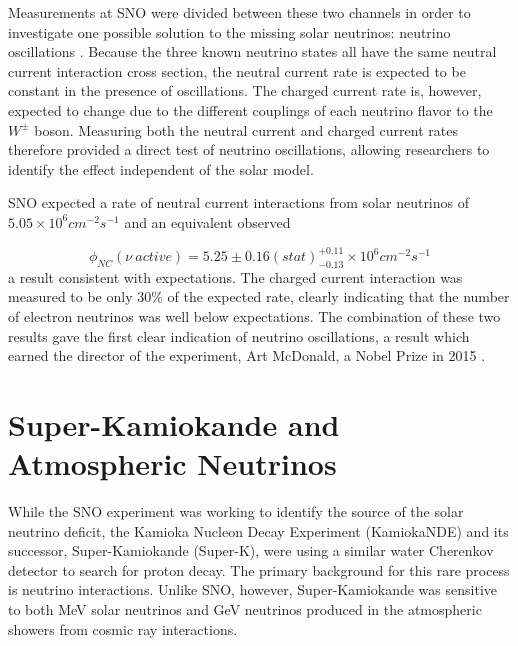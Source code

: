 Measurements at SNO were divided between these two channels in order to investigate one possible solution to the missing solar neutrinos: neutrino oscillations \cite{SNO-Proposal}.
Because the three known neutrino states all have the same neutral current interaction cross section, the neutral current rate is expected to be constant in the presence of oscillations.
The charged current rate is, however, expected to change due to the different couplings of each neutrino flavor to the $W^{\pm}$ boson.
Measuring both the neutral current and charged current rates therefore provided a direct test of neutrino oscillations, allowing researchers to identify the effect independent of the solar model.

SNO expected a rate of neutral current interactions from solar neutrinos of $5.05 \times 10^6 cm^{-2} s^{-1}$ and an equivalent observed 

\begin{equation}
\phi_{NC}\left(\nu \ active \right) = 5.25 \pm 0.16 (stat) ^{+0.11}_{-0.13} \times 10^6 cm^{-2} s^{-1}
\end{equation}
%
a result consistent with expectations.
The charged current interaction was measured to be only 30\% of the expected rate, clearly indicating that the number of electron neutrinos was well below expectations.
The combination of these two results gave the first clear indication of neutrino oscillations, a result which earned the director of the experiment, Art McDonald, a Nobel Prize in 2015 \cite{NobelPrize:2015-Oscillations}.

\section{Super-Kamiokande and Atmospheric Neutrinos}
\label{sec:superk_atmo}
While the SNO experiment was working to identify the source of the solar neutrino deficit, the Kamioka Nucleon Decay Experiment (KamiokaNDE) and its successor, Super-Kamiokande (Super-K), were using a similar water Cherenkov detector to search for proton decay.
The primary background for this rare process is neutrino interactions.
Unlike SNO, however, Super-Kamiokande was sensitive to both MeV solar neutrinos and GeV neutrinos produced in the atmospheric showers from cosmic ray interactions. 

